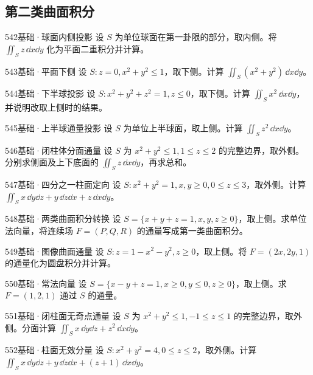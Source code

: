 \subsection{第二类曲面积分}
\begin{exercise}{542}{基础·球面内侧投影}
设 $S$ 为单位球面在第一卦限的部分，取内侧。将 $\iint_Sz\,\dd x\dd y$ 化为平面二重积分并计算。
\end{exercise}
\begin{exercise}{543}{基础·平面下侧}
设 $S:z=0,x^2+y^2\leq1$，取下侧。计算 $\iint_S(x^2+y^2)\,\dd x\dd y$。
\end{exercise}
\begin{exercise}{544}{基础·下半球投影}
设 $S:x^2+y^2+z^2=1,z\leq0$，取下侧。计算 $\iint_Sx^2\,\dd x\dd y$，并说明改取上侧时的结果。
\end{exercise}
\begin{exercise}{545}{基础·上半球通量投影}
设 $S$ 为单位上半球面，取上侧。计算 $\iint_Sz^2\,\dd x\dd y$。
\end{exercise}
\begin{exercise}{546}{基础·闭柱体分面通量}
设 $S$ 为 $x^2+y^2\leq1,1\leq z\leq2$ 的完整边界，取外侧。分别求侧面及上下底面的 $\iint_Sz\,\dd x\dd y$，再求总和。
\end{exercise}
\begin{exercise}{547}{基础·四分之一柱面定向}
设 $S:x^2+y^2=1,x,y\geq0,0\leq z\leq3$，取外侧。计算 $\iint_Sx\,\dd y\dd z+y\,\dd z\dd x+z\,\dd x\dd y$。
\end{exercise}
\begin{exercise}{548}{基础·两类曲面积分转换}
设 $S=\{x+y+z=1,x,y,z\geq0\}$，取上侧。求单位法向量，将连续场 $F=(P,Q,R)$ 的通量写成第一类曲面积分。
\end{exercise}
\begin{exercise}{549}{基础·图像曲面通量}
设 $S:z=1-x^2-y^2,z\geq0$，取上侧。将 $F=(2x,2y,1)$ 的通量化为圆盘积分并计算。
\end{exercise}
\begin{exercise}{550}{基础·常法向量}
设 $S=\{x-y+z=1,x\geq0,y\leq0,z\geq0\}$，取上侧。求 $F=(1,2,1)$ 通过 $S$ 的通量。
\end{exercise}
\begin{exercise}{551}{基础·闭柱面无奇点通量}
设 $S$ 为 $x^2+y^2\leq1,-1\leq z\leq1$ 的完整边界，取外侧。分面计算 $\iint_Sx\,\dd y\dd z+z^2\,\dd x\dd y$。
\end{exercise}
\begin{exercise}{552}{基础·柱面无效分量}
设 $S:x^2+y^2=4,0\leq z\leq2$，取外侧。计算 $\iint_Sx\,\dd y\dd z+y\,\dd z\dd x+(z+1)\,\dd x\dd y$。
\end{exercise}
